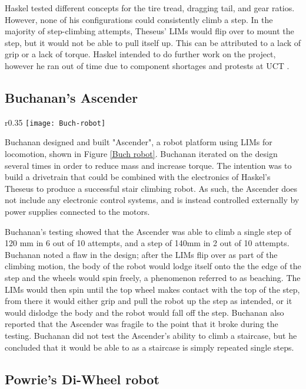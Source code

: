 Haskel tested different concepts for the tire tread, dragging tail, and gear ratios. However, none of his configurations could consistently climb a step. In the majority of step-climbing attempts, Theseus' LIMs would flip over to mount the step, but it would not be able to pull itself up. This can be attributed to a lack of grip or a lack of torque. Haskel intended to do further work on the project, however he ran out of time due to component shortages and protests at UCT \citep{Haskel-2017}.
\newpage
\subsection{Buchanan's Ascender} %

\begin{wrapfigure}{r}{0.35\textwidth}
	\centering
	\texttt{[image: Buch-robot]}
	\caption{Buchanan's Ascender \citep{Buchanan-2018}.}
	\label{Buch robot}
\end{wrapfigure}
Buchanan designed and built "Ascender", a robot platform using LIMs for locomotion, shown in Figure \ref{Buch robot}. Buchanan iterated on the design several times in order to reduce mass and increase torque. The intention was to build a drivetrain that could be combined with the electronics of Haskel's Theseus to produce a successful stair climbing robot. As such, the Ascender does not include any electronic control systems, and is instead controlled externally by power supplies connected to the motors.

Buchanan's testing showed that the Ascender was able to climb a single step of 120 mm in 6 out of 10 attempts, and a step of 140mm in 2 out of 10 attempts. Buchanan noted a flaw in the design; after the LIMs flip over as part of the climbing motion, the body of the robot would lodge itself onto the the edge of the step and the wheels would spin freely, a phenomenon referred to as beaching. The LIMs would then spin until the top wheel makes contact with the top of the step, from there it would either grip and pull the robot up the step as intended, or it would dislodge the body and the robot would fall off the step. Buchanan also reported that the Ascender was fragile to the point that it broke during the testing. Buchanan did not test the Ascender's ability to climb a staircase, but he concluded that it would be able to as a staircase is simply repeated single steps. \citep{Buchanan-2018}

\subsection{Powrie's Di-Wheel robot}


